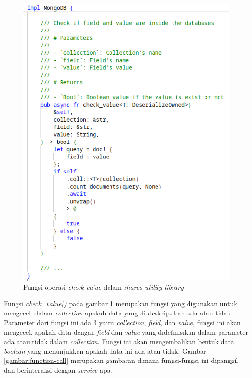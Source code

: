 \begin{figure}[H]
  \centering
  \includegraphics[keepaspectratio, width=12cm]{gambar/util-check-value-code.png}
  \caption{Fungsi operasi \emph{check value} dalam \emph{shared utility library}}
  \label{gambar:checkval-util-code}
\end{figure}

Fungsi \emph{check\_value()} pada gambar \ref{gambar:checkval-util-code} merupakan fungsi yang digunakan untuk mengecek dalam \emph{collection} apakah data yang di deskripsikan ada atau tidak. Parameter dari fungsi ini ada 3 yaitu \emph{collection}, \emph{field}, dan \emph{value}, fungsi ini akan mengecek apakah data dengan \emph{field} dan \emph{value} yang didefinisikan dalam parameter ada atau tidak dalam \emph{collection}. Fungsi ini akan mengembalikan bentuk data \emph{boolean} yang menunjukkan apakah data ini ada atau tidak. Gambar \ref{gambar:function-call} merupakan gambaran dimana fungsi-fungsi ini dipanggil dan berinteraksi dengan \emph{service} apa.

